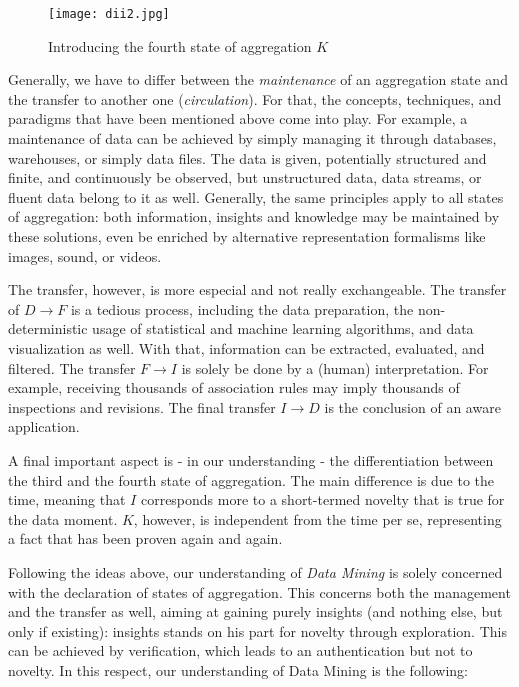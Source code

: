\documentclass[10pt,latex8]{article}
\begin{document}
\begin{figure}[htbp]
   \centering
   \texttt{[image: dii2.jpg]} 
   \caption{Introducing the fourth state of aggregation $K$}
   \label{fig:dii2}
\end{figure}



Generally, we have to differ between the \textit{maintenance} of an aggregation state and the transfer to another one (\textit{circulation}). For that, the concepts, techniques, and paradigms that have been mentioned above come into play. For example, a maintenance of data can be achieved by simply managing it through databases, warehouses, or simply data files. The data is given, potentially structured and finite, and continuously be observed, but unstructured data, data streams, or fluent data belong to it as well. Generally, the same principles apply to all states of aggregation: both information, insights and knowledge may be maintained by these solutions, even be enriched by alternative representation formalisms like images, sound, or videos.

The transfer, however, is more especial and not really exchangeable. The transfer of $D\rightarrow F$ is a tedious process, including the data preparation, the non-deterministic usage of statistical and machine learning algorithms, and data visualization as well. With that, information can be extracted, evaluated, and filtered. The transfer $F\rightarrow I$ is solely be done by a (human) interpretation. For example, receiving thousands of association rules may imply thousands of inspections and revisions. The final transfer $I\rightarrow D$ is the conclusion of an aware application.

A final important aspect is - in our understanding - the differentiation between the third and the fourth state of aggregation. The main difference is due to the time, meaning that $I$ corresponds more to a short-termed novelty that is true for the data moment. $K$, however, is independent from the time per se, representing a fact that has been proven again and again. 

\label{def}
Following the ideas above, our understanding of \textit{Data Mining} is solely concerned with the declaration of states of aggregation. This concerns both the management and the transfer as well, aiming at gaining purely insights (and nothing else, but only if existing): insights stands on his part for novelty through exploration. This can be achieved by verification, which leads to an authentication but not to novelty. In this respect, our understanding of Data Mining is the following:
\end{document}
